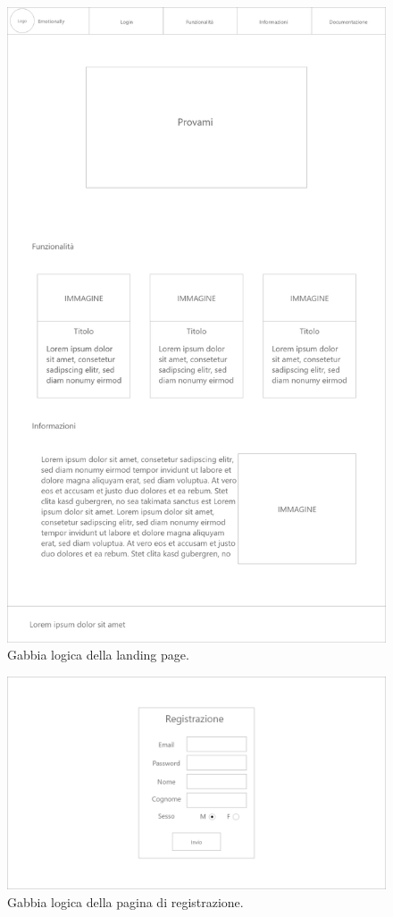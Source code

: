 \begin{figure}[H]
	\centering
	\caption{Gabbia logica della landing page.}
	\label{fig:gabbie-logiche:landing-page}
	\includegraphics[height=\textheight-3ex]{images/gabbie-logiche/Landing}
\end{figure}

\begin{figure}[H]
	\centering

	\caption{Gabbia logica della pagina di registrazione.}
	\label{fig:gabbie-logiche:registrazione}
	\includegraphics[width=\textwidth]{images/gabbie-logiche/Registrazione}
\end{figure}


